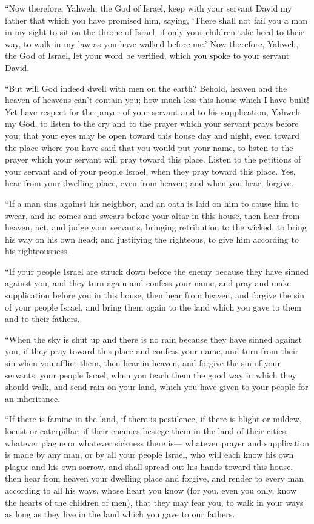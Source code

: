  ``Now therefore, Yahweh, the God of Israel, keep with your
servant David my father that which you have promised him, saying, `There
shall not fail you a man in my sight to sit on the throne of Israel, if
only your children take heed to their way, to walk in my law as you have
walked before me.'  Now therefore, Yahweh, the God of
Israel, let your word be verified, which you spoke to your servant
David.

 ``But will God indeed dwell with men on the earth? Behold,
heaven and the heaven of heavens can't contain you; how much less this
house which I have built!  Yet have respect for the prayer
of your servant and to his supplication, Yahweh my God, to listen to the
cry and to the prayer which your servant prays before you; 
that your eyes may be open toward this house day and night, even toward
the place where you have said that you would put your name, to listen to
the prayer which your servant will pray toward this place. 
Listen to the petitions of your servant and of your people Israel, when
they pray toward this place. Yes, hear from your dwelling place, even
from heaven; and when you hear, forgive.

 ``If a man sins against his neighbor, and an oath is laid
on him to cause him to swear, and he comes and swears before your altar
in this house,  then hear from heaven, act, and judge your
servants, bringing retribution to the wicked, to bring his way on his
own head; and justifying the righteous, to give him according to his
righteousness.

 ``If your people Israel are struck down before the enemy
because they have sinned against you, and they turn again and confess
your name, and pray and make supplication before you in this house,
 then hear from heaven, and forgive the sin of your people
Israel, and bring them again to the land which you gave to them and to
their fathers.

 ``When the sky is shut up and there is no rain because
they have sinned against you, if they pray toward this place and confess
your name, and turn from their sin when you afflict them, 
then hear in heaven, and forgive the sin of your servants, your people
Israel, when you teach them the good way in which they should walk, and
send rain on your land, which you have given to your people for an
inheritance.

 ``If there is famine in the land, if there is pestilence,
if there is blight or mildew, locust or caterpillar; if their enemies
besiege them in the land of their cities; whatever plague or whatever
sickness there is---  whatever prayer and supplication is
made by any man, or by all your people Israel, who will each know his
own plague and his own sorrow, and shall spread out his hands toward
this house,  then hear from heaven your dwelling place and
forgive, and render to every man according to all his ways, whose heart
you know (for you, even you only, know the hearts of the children of
men),  that they may fear you, to walk in your ways as long
as they live in the land which you gave to our fathers.

